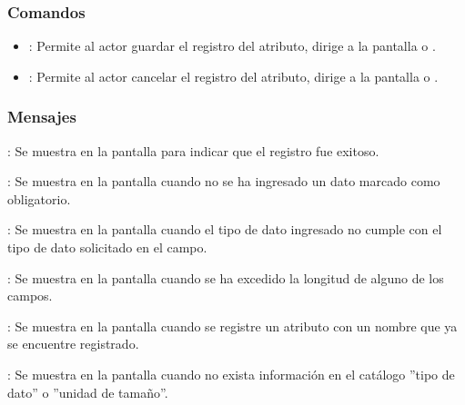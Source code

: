 \subsubsection{Comandos}
\begin{itemize}
	\item {}: Permite al actor guardar el registro del atributo, dirige a la pantalla  o .
	\item {}: Permite al actor cancelar el registro del atributo, dirige a la pantalla  o .
\end{itemize}

\subsubsection{Mensajes}

\begin{Citemize}
	\item {}: Se muestra en la pantalla  para indicar que el registro fue exitoso.
	\item {}: Se muestra en la pantalla  cuando no se ha ingresado un dato marcado como obligatorio.
	\item {}: Se muestra en la pantalla  cuando el tipo de dato ingresado no cumple con el tipo de dato solicitado en el campo.
	\item {}: Se muestra en la pantalla  cuando se ha excedido la longitud de alguno de los campos.
	\item {}: Se muestra en la pantalla  cuando se registre un atributo con un nombre que ya se encuentre registrado.
	\item {}: Se muestra en la pantalla  cuando no exista información en el catálogo ''tipo de dato'' o ''unidad de tamaño''.
\end{Citemize}
